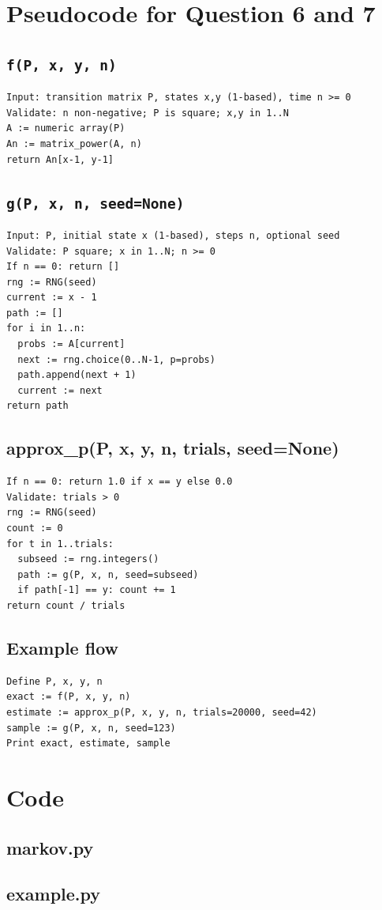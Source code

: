 \documentclass{article}
\begin{document}
\section*{Pseudocode for Question 6 and 7}
\subsection*{\texttt{f(P, x, y, n)}}
\begin{lstlisting}[basicstyle=\ttfamily\small]
Input: transition matrix P, states x,y (1-based), time n >= 0
Validate: n non-negative; P is square; x,y in 1..N
A := numeric array(P)
An := matrix_power(A, n)
return An[x-1, y-1]
\end{lstlisting}

\subsection*{\texttt{g(P, x, n, seed=None)}}
\begin{lstlisting}[basicstyle=\ttfamily\small]
Input: P, initial state x (1-based), steps n, optional seed
Validate: P square; x in 1..N; n >= 0
If n == 0: return []
rng := RNG(seed)
current := x - 1
path := []
for i in 1..n:
  probs := A[current]
  next := rng.choice(0..N-1, p=probs)
  path.append(next + 1)
  current := next
return path
\end{lstlisting}

\subsection*{approx\_p(P, x, y, n, trials, seed=None)}
\begin{lstlisting}[basicstyle=\ttfamily\small]
If n == 0: return 1.0 if x == y else 0.0
Validate: trials > 0
rng := RNG(seed)
count := 0
for t in 1..trials:
  subseed := rng.integers()
  path := g(P, x, n, seed=subseed)
  if path[-1] == y: count += 1
return count / trials
\end{lstlisting}

\subsection*{Example flow}
\begin{lstlisting}[basicstyle=\ttfamily\small]
Define P, x, y, n
exact := f(P, x, y, n)
estimate := approx_p(P, x, y, n, trials=20000, seed=42)
sample := g(P, x, n, seed=123)
Print exact, estimate, sample
\end{lstlisting}

\section*{Code}
\subsection*{markov.py}


\subsection*{example.py}

\end{document}
